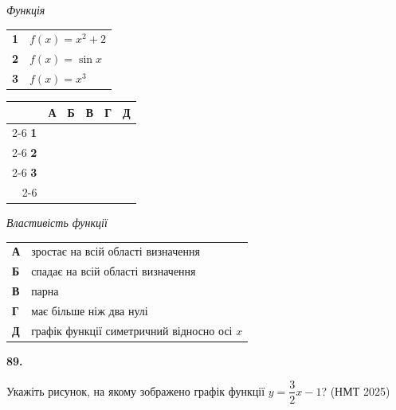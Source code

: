 \documentclass[14pt]{extarticle}
\newcommand{\answerGrid}{
    \begingroup
    \renewcommand{\arraystretch}{1.3} 
    \setlength{\tabcolsep}{7pt} 
    \begin{tabular}{r|c|c|c|c|c|}
         \multicolumn{1}{c}{} & \multicolumn{1}{c}{\textbf{А}} & \multicolumn{1}{c}{\textbf{Б}} & \multicolumn{1}{c}{\textbf{В}} & \multicolumn{1}{c}{\textbf{Г}} & \multicolumn{1}{c}{\textbf{Д}} \\ \cline{2-6}
         \textbf{1} & & & & & \\ \cline{2-6}
         \textbf{2} & & & & & \\ \cline{2-6}
         \textbf{3} & & & & & \\ \cline{2-6}
    \end{tabular}
    \endgroup
}
\newcommand{\nmtyear}[1]{\hfill{\small\color{yearcolor}(НМТ #1)}}
\begin{document}
\noindent
\begin{minipage}[t]{0.45\textwidth}
    \textit{Функція} \par \vspace{0.2cm}
    \begin{tabular}{@{}p{0.5cm} l@{}}
    \textbf{1} & $f(x)=x^2+2$ \\[0.4cm]
    \textbf{2} & $f(x)=\sin x$ \\[0.4cm]
    \textbf{3} & $f(x)=x^3$ \\
    \end{tabular}

    \vspace{1.0cm}
    \answerGrid
\end{minipage}%
\hfill
\begin{minipage}[t]{0.50\textwidth}
    \textit{Властивість функції} \par \vspace{0.2cm}
    \begin{tabular}{@{}p{0.5cm} p{7cm}@{}}
    \textbf{А} & зростає на всій області визначення \\[0.2cm]
    \textbf{Б} & спадає на всій області визначення \\[0.2cm]
    \textbf{В} & парна \\[0.2cm]
    \textbf{Г} & має більше ніж два нулі \\[0.2cm]
    \textbf{Д} & графік функції симетричний відносно осі $x$ \\
    \end{tabular}
\end{minipage}

\vspace{0.7cm}

\noindent\textbf{89.} \begin{minipage}[t]{0.55\textwidth}
Укажіть рисунок, на якому зображено графік функції $y = \dfrac{3}{2}x - 1$? \nmtyear{2025}
\end{minipage}
\end{document}
